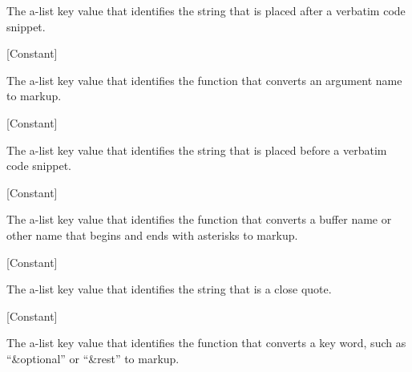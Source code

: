 \begin{doc-string}
The a-list key value that identifies the string that is placed after a verbatim
code snippet.
\end{doc-string}

\vspace{1em}
\noindent
{}
\usebox{\funcname}
 \hfill [Constant]

\begin{doc-string}
The a-list key value that identifies the function that converts an argument name
to markup.
\end{doc-string}

\vspace{1em}
\noindent
{}
\usebox{\funcname}
 \hfill [Constant]

\begin{doc-string}
The a-list key value that identifies the string that is placed before a verbatim
code snippet.
\end{doc-string}

\vspace{1em}
\noindent
{}
\usebox{\funcname}
 \hfill [Constant]

\begin{doc-string}
The a-list key value that identifies the function that converts a buffer name or
other name that begins and ends with asterisks to markup.
\end{doc-string}

\vspace{1em}
\noindent
{}
\usebox{\funcname}
 \hfill [Constant]

\begin{doc-string}
The a-list key value that identifies the string that is a close quote.
\end{doc-string}

\vspace{1em}
\noindent
{}
\usebox{\funcname}
 \hfill [Constant]

\begin{doc-string}
The a-list key value that identifies the function that converts a key word, such
as ``\&optional'' or ``\&rest'' to markup.
\end{doc-string}

